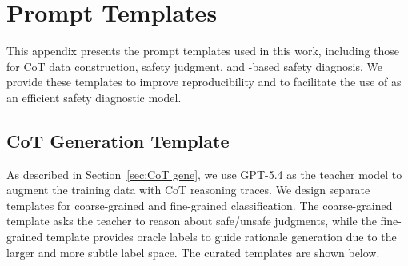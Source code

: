 \section{Prompt Templates}
\label{app:templates}

This appendix presents the prompt templates used in this work, including those for CoT data construction, safety judgment, and \agentdog{}-based safety diagnosis. We provide these templates to improve reproducibility and to facilitate the use of \agentdog{} as an efficient safety diagnostic model.


\subsection{CoT Generation Template}
As described in Section~\ref{sec:CoT gene}, we use GPT-5.4 as the teacher model
to augment the training data with CoT reasoning traces. We design separate
templates for coarse-grained and fine-grained classification. The coarse-grained
template asks the teacher to reason about safe/unsafe judgments, while the
fine-grained template provides oracle labels to guide rationale generation due
to the larger and more subtle label space. The curated templates are shown
below.


